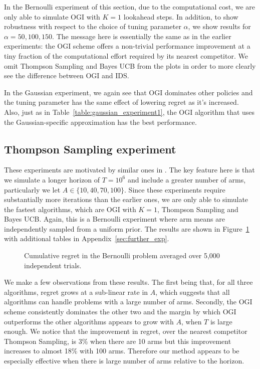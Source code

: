 In the Bernoulli experiment of this section, due to the computational cost, we are only able to simulate OGI with $K = 1$ lookahead steps. In addition, to show robustness with respect to the choice of tuning parameter $\alpha$, we show results for $\alpha = 50,100,150$. The message here is essentially the same as in the earlier experiments: the OGI scheme offers a non-trivial performance improvement at a tiny fraction of the computational effort required by its nearest competitor. We omit Thompson Sampling and Bayes UCB from the plots in order to more clearly see the difference between OGI and IDS.

In the Gaussian experiment, we again see that OGI dominates other policies and the tuning parameter has the same effect of lowering regret as it's increased. Also, just as in Table~\ref{table:gaussian_experiment1}, the OGI algorithm that uses the Gaussian-specific approximation has the best performance. 

\subsection{Thompson Sampling experiment} \label{exp:ts_sampling_experiment}
These experiments are motivated by similar ones in \cite{chapelle2011empirical}. The key feature here is that we simulate a longer horizon of $T = 10^6$ and include a greater number of arms, particularly we let $A \in \{10,40,70,100\}$. Since these experiments require substantially more iterations than the earlier ones, we are only able to simulate the fastest algorithms, which are OGI with $K=1$, Thompson Sampling and Bayes UCB. Again, this is a Bernoulli experiment where arm means are independently sampled from a uniform prior. The results are shown in Figure~\ref{fig:chapelle_and_li} with additional tables in Appendix~\ref{sec:further_exp}.
\begin{figure}
	\centering
	
	\caption{Cumulative regret in the Bernoulli problem averaged over 5,000 independent trials.}
	\label{fig:chapelle_and_li}
\end{figure}

We make a few observations from these results. The first being that, for all three algorithms, regret grows at a sub-linear rate in $A$, which suggests that all algorithms can handle problems with a large number of arms. Secondly, the OGI scheme consistently dominates the other two and the margin by which OGI outperforms the other algorithms appears to grow with $A$, when $T$ is large enough. We notice that the improvement in regret, over the nearest competitor Thompson Sampling, is 3\% when there are 10 arms but this improvement increases to almost 18\% with 100 arms. Therefore our method appears to be especially effective when there is large number of arms relative to the horizon.
